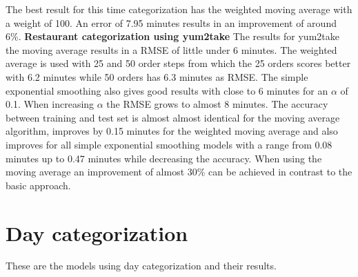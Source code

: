 The best result for this time categorization has the weighted moving average with a weight of 100. An error of 7.95 minutes results in an improvement of around 6\%.
\newline\newline\textbf{Restaurant categorization using yum2take}\newline
The results for yum2take the moving average results in a RMSE of little under 6 minutes. The weighted average is used with 25 and 50 order steps from which the 25 orders scores better with 6.2 minutes while 50 orders has 6.3 minutes as RMSE. The simple exponential smoothing also gives good results with close to 6 minutes for an $\alpha$ of 0.1. When increasing $\alpha$ the RMSE grows to almost 8 minutes. The accuracy between training and test set is almost almost identical for the moving average algorithm, improves by 0.15 minutes for the weighted moving average and also improves for all simple exponential smoothing models with a range from 0.08 minutes up to 0.47 minutes while decreasing the accuracy.\newline
When using the moving average an improvement of almost 30\% can be achieved in contrast to the basic approach.
\section{Day categorization}\label{section:Day categorization}
These are the models using day categorization and their results.

